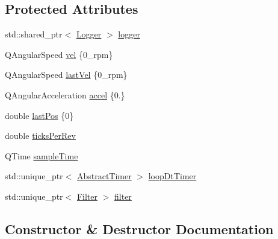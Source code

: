 \subsection*{Protected Attributes}
\begin{DoxyCompactItemize}
\item 
std\+::shared\+\_\+ptr$<$ \mbox{\hyperlink{classokapi_1_1Logger}{Logger}} $>$ \mbox{\hyperlink{classokapi_1_1VelMath_aab9b5774fde584b40fb113808d59eb8b}{logger}}
\item 
Q\+Angular\+Speed \mbox{\hyperlink{classokapi_1_1VelMath_af8386892892d453a118581e46839a0c3}{vel}} \{0\+\_\+rpm\}
\item 
Q\+Angular\+Speed \mbox{\hyperlink{classokapi_1_1VelMath_a237571e8eece5874fdc599e5c49c2258}{last\+Vel}} \{0\+\_\+rpm\}
\item 
Q\+Angular\+Acceleration \mbox{\hyperlink{classokapi_1_1VelMath_abe73288852f21916155e04266faea8b7}{accel}} \{0.\}
\item 
double \mbox{\hyperlink{classokapi_1_1VelMath_a9f669c3d70753ef68971dae4b6f45c27}{last\+Pos}} \{0\}
\item 
double \mbox{\hyperlink{classokapi_1_1VelMath_ad889516cc153d23febbbfd4c9c45e5ec}{ticks\+Per\+Rev}}
\item 
Q\+Time \mbox{\hyperlink{classokapi_1_1VelMath_a015a781b3f7f454f24b1a86a43a9a76d}{sample\+Time}}
\item 
std\+::unique\+\_\+ptr$<$ \mbox{\hyperlink{classokapi_1_1AbstractTimer}{Abstract\+Timer}} $>$ \mbox{\hyperlink{classokapi_1_1VelMath_a36a8a63ac4b47806259e080cfbd0d462}{loop\+Dt\+Timer}}
\item 
std\+::unique\+\_\+ptr$<$ \mbox{\hyperlink{classokapi_1_1Filter}{Filter}} $>$ \mbox{\hyperlink{classokapi_1_1VelMath_ab100cf49e925d37139d5bf4c4aca87d0}{filter}}
\end{DoxyCompactItemize}


\subsection{Constructor \& Destructor Documentation}
\mbox{\label{classokapi_1_1VelMath_a47804f85fa8beb088602811217d0a996}} 

